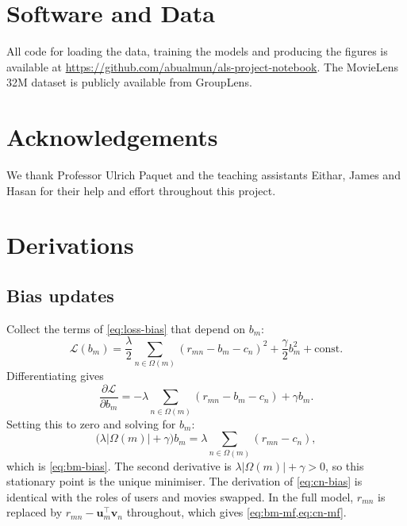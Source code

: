 \documentclass{article}
\theoremstyle{plain}
\theoremstyle{definition}
\theoremstyle{remark}
\begin{document}
\section*{Software and Data}

All code for loading the data, training the models and producing the
figures is available at
\url{https://github.com/abualmun/als-project-notebook}. The MovieLens 32M
dataset is publicly available from GroupLens.

\section*{Acknowledgements}

We thank Professor Ulrich Paquet and the teaching assistants Eithar, James
and Hasan for their help and effort throughout this project.




\newpage
\appendix
\onecolumn

\section{Derivations}
\label{app:derivations}

\subsection{Bias updates}
\label{app:bias}

Collect the terms of \cref{eq:loss-bias} that depend on $b_m$:
\begin{equation*}
  \mathcal{L}(b_m) = \frac{\lambda}{2} \sum_{n \in \Omega(m)}
  \left( r_{mn} - b_m - c_n \right)^2 + \frac{\gamma}{2} b_m^2 + \text{const}.
\end{equation*}
Differentiating gives
\begin{equation*}
  \frac{\partial \mathcal{L}}{\partial b_m}
  = -\lambda \sum_{n \in \Omega(m)} \left( r_{mn} - b_m - c_n \right)
    + \gamma b_m .
\end{equation*}
Setting this to zero and solving for $b_m$:
\begin{equation*}
  \big( \lambda |\Omega(m)| + \gamma \big) b_m
  = \lambda \sum_{n \in \Omega(m)} \left( r_{mn} - c_n \right),
\end{equation*}
which is \cref{eq:bm-bias}. The second derivative is
$\lambda|\Omega(m)| + \gamma > 0$, so this stationary point is the unique
minimiser. The derivation of \cref{eq:cn-bias} is identical with the roles
of users and movies swapped. In the full model, $r_{mn}$ is replaced by
$r_{mn} - \mathbf{u}_m^\top \mathbf{v}_n$ throughout, which gives
\cref{eq:bm-mf,eq:cn-mf}.
\end{document}
